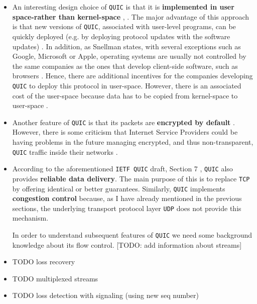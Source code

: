 \documentclass[12pt,a4paper,twoside,openright]{report}
\begin{document}
\begin{itemize}
  \item 
  An interesting design choice of \texttt{QUIC} is that it is \textbf{implemented in user space-rather than kernel-space} \cite{the-road-to-quic}, \cite{Implementation_and_Performance_Evaluation_of_the_QUIC_Protocol_in_Linux_Kernel}.
  The major advantage of this approach is that new versions of \texttt{QUIC}, associated with user-level programs, can be quickly deployed (e.g. by deploying protocol updates with the software updates) \cite{the-road-to-quic}.
  In addition, as Snellman states, with several exceptions such as Google, Microsoft or Apple, operating systems are usually not controlled by the same companies as the ones that develop client-side software, such as browsers \cite{2016-12-01-quic-tou}.
  Hence, there are additional incentives for the companies developing \texttt{QUIC} to deploy this protocol in user-space.
  However, there is an associated cost of the user-space because data has to be copied from kernel-space to user-space \cite{benchmarking-quic}.
  
  
 
  \item Another feature of \texttt{QUIC} is that its packets are \textbf{encrypted by default} \cite{the-road-to-quic}.
  However, there is some criticism that Internet Service Providers could be having problems in the future managing encrypted, and thus non-transparent, \texttt{QUIC} traffic inside their networks \cite{why-is-googles-quic-leaving-network-operators-in-the-dark}.
  
  


  \item 
    According to the aforementioned \texttt{IETF QUIC} draft, Section 7 \cite{ietf-quic-transport-draft}, \texttt{QUIC} also provides \textbf{reliable data delivery}.
    The main purpose of this is to replace \texttt{TCP} by offering identical or better guarantees. 
    Similarly, \texttt{QUIC} implements \textbf{congestion control} because, as I have already mentioned in the previous sections, the underlying transport protocol layer \texttt{UDP} does not provide this mechanism. 
  
  
  In order to understand subsequent features of \texttt{QUIC} we need some background knowledge about its flow control.
  [TODO: add information about streams]
  
  
  
  
  \item TODO loss recovery

  \item TODO multiplexed streams
 
  \item TODO loss detection with signaling (using new seq number)
  
  
  
  
  
\end{itemize}
\end{document}
